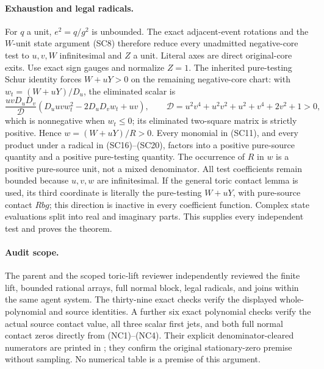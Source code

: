 \paragraph{Exhaustion and legal radicals.}
For $q$ a unit, $e^2=q/g^2$ is unbounded. The exact adjacent-event
rotations and the $W$-unit state argument (SC8) therefore reduce every
unadmitted negative-core test to $u,v,W$ infinitesimal and $Z$ a unit.
Literal axes are direct original-core exits. Use exact sign gauges and
normalize $Z=1$. The inherited pure-testing Schur identity forces
$W+uY>0$ on the remaining negative-core chart: with
$w_t=(W+uY)/D_u$, the eliminated scalar is
\[
 \frac{uvD_uD_v}{\mathcal D}
       (D_uuv w_t^2-2D_uD_vw_t+uv),\qquad
 \mathcal D=u^2v^4+u^2v^2+u^2+v^4+2v^2+1>0,
\]
which is nonnegative when $w_t\le0$; its eliminated two-square
matrix is strictly positive. Hence $w=(W+uY)/R>0$.
Every monomial in (SC11), and every product under a radical in
(SC16)--(SC20), factors into a positive pure-source quantity and a
positive pure-testing quantity. The occurrence of $R$ in $w$ is a
positive pure-source unit, not a mixed denominator. All test
coefficients remain bounded because $u,v,w$ are infinitesimal.
If the general toric contact lemma is used, its third coordinate
is literally the pure-testing $W+uY$, with pure-source contact
$Rbg$; this direction is inactive in every coefficient function.
Complex state evaluations split into real and imaginary parts.
This supplies every independent test and proves the theorem.

\paragraph{Audit scope.}
The parent and the scoped toric-lift reviewer independently reviewed
the finite lift, bounded rational arrays, full normal block, legal
radicals, and joins within the same agent system. The thirty-nine
exact checks verify the displayed whole-polynomial and source
identities. A further six exact polynomial checks verify the actual
source contact value, all three scalar first jets, and both full
normal contact zeros directly from (NC1)--(NC4). Their explicit
denominator-cleared numerators are printed in
; they confirm the original
stationary-zero premise without sampling. No numerical table is a
premise of this argument.
